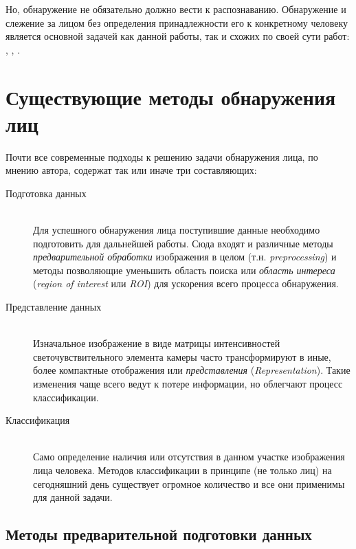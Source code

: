 \documentclass[12pt]{report}
\begin{document}
Но, обнаружение не обязательно должно вести к распознаванию. Обнаружение и слежение за лицом без определения 
принадлежности его к конкретному человеку является основной задачей как данной работы, так и схожих по своей сути 
работ: \citep{capi2010vision}, \citep{luo2007face}, \citep{saxena2008real}.





\section{Существующие методы обнаружения лиц}

Почти все современные подходы к решению задачи обнаружения лица, по мнению автора, содержат так или иначе три 
составляющих:

\begin{description}

\item[Подготовка данных]\hfill \\
	Для успешного обнаружения лица поступившие данные необходимо подготовить для дальнейшей работы. Сюда входят и 
различные методы \emph{предварительной обработки} изображения в целом (т.н. \textit{preprocessing}) и методы 
позволяющие уменьшить область поиска или \emph{область интереса} (\textit{region of interest} или \textit{ROI}) для 
ускорения всего процесса обнаружения.
\item[Представление данных]\hfill \\ 
	Изначальное изображение в виде матрицы интенсивностей светочувствительного элемента камеры часто трансформируют 
в 
иные, более компактные отображения или \emph{представления} (\textit{Representation}). Такие изменения чаще всего 
ведут к потере информации, но облегчают процесс классификации.
\item[Классификация]\hfill \\ 
	Само определение наличия или отсутствия в данном участке изображения лица человека. Методов классификации в 
принципе 
(не только лиц) на сегодняшний день существует огромное количество и все они применимы для данной задачи.
\end{description}

\subsection{Методы предварительной подготовки данных}
\end{document}
